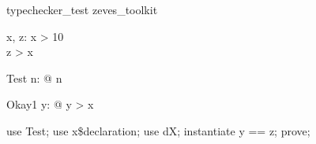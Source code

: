 \begin{zsection}
   \SECTION typechecker\_test \parents zeves\_toolkit
\end{zsection}

\begin{axdef}
   x, z: \nat
\where
    x > 10
   \\
    z > x
\end{axdef}

\begin{theorem}{Test}
    \forall n: \nat @ n 
\end{theorem}

\begin{theorem}{Okay1}
    \exists y: \nat @ y > x
\end{theorem}

\begin{zproof}[Okay1]
   use Test;
   use x\$declaration;
   use dX;
   instantiate y == z;
   prove;
\end{zproof}